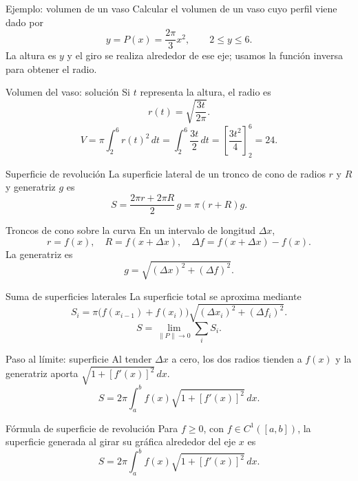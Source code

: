 \documentclass[main.tex]{subfiles}
\begin{document}
\begin{frame}{Ejemplo: volumen de un vaso}
Calcular el volumen de un vaso cuyo perfil viene dado por\[y=P(x)=\frac{2\pi}{3}x^2,\qquad 2\le y\le6.\]La altura es $y$ y el giro se realiza alrededor de ese eje; usamos la función inversa para obtener el radio.
\end{frame}

\begin{frame}{Volumen del vaso: solución}
\small Si $t$ representa la altura, el radio es\[r(t)=\sqrt{\frac{3t}{2\pi}}.\]\[V=\pi\int_2^6r(t)^2\,dt=\int_2^6\frac{3t}{2}\,dt=\left[\frac{3t^2}{4}\right]_2^6=\boxed{24}.\]
\end{frame}

\begin{frame}{Superficie de revolución}
La superficie lateral de un tronco de cono de radios $r$ y $R$ y generatriz $g$ es\[S=\frac{2\pi r+2\pi R}{2}\,g=\boxed{\pi(r+R)g}.\]
\end{frame}

\begin{frame}{Troncos de cono sobre la curva}
\small En un intervalo de longitud $\Delta x$,\[r=f(x),\quad R=f(x+\Delta x),\quad\Delta f=f(x+\Delta x)-f(x).\]La generatriz es\[g=\sqrt{(\Delta x)^2+(\Delta f)^2}.\]
\end{frame}

\begin{frame}{Suma de superficies laterales}
\small La superficie total se aproxima mediante\[S_i=\pi\bigl(f(x_{i-1})+f(x_i)\bigr)\sqrt{(\Delta x_i)^2+(\Delta f_i)^2}.\]\[S=\lim_{\|P\|\to0}\sum_i S_i.\]
\end{frame}

\begin{frame}{Paso al límite: superficie}
\small Al tender $\Delta x$ a cero, los dos radios tienden a $f(x)$ y la generatriz aporta $\sqrt{1+[f\prime(x)]^2}\,dx$.\[S=2\pi\int_a^b f(x)\sqrt{1+[f\prime(x)]^2}\,dx.\]
\end{frame}

\begin{frame}{Fórmula de superficie de revolución}
Para $f\ge0$, con $f\in C^1([a,b])$, la superficie generada al girar su gráfica alrededor del eje $x$ es\[\boxed{S=2\pi\int_a^b f(x)\sqrt{1+[f\prime(x)]^2}\,dx.}\]
\end{frame}
\end{document}
